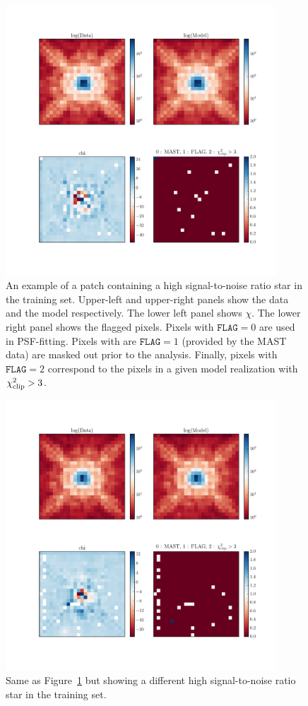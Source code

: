 \begin{figure}
\includegraphics[width=0.9\textwidth , height=0.9\textwidth ]{figures/wfc3ir/training.pdf}
\caption{\label{fig:training_1} An example of a patch containing a high signal-to-noise ratio star in the training set. Upper-left and upper-right panels show the data and the model respectively. The lower left panel shows $\chi$. The lower right panel shows the flagged pixels. Pixels with $\mathtt{FLAG}=0$ are used in PSF-fitting. Pixels with are $\mathtt{FLAG}=1$ (provided by the MAST data) are masked out prior to the analysis. Finally, pixels with $\mathtt{FLAG}=2$ correspond to the pixels in a given model realization with $\chi^{2}_{\rm clip} > 3$.}
\end{figure}

\begin{figure}
\includegraphics[width=0.9\textwidth , height=0.9\textwidth ]{figures/wfc3ir/training2.pdf}
\caption{\label{fig:training_2} Same as Figure~\ref{fig:training_1} but showing a different high signal-to-noise ratio star in the training set.}
\end{figure}

